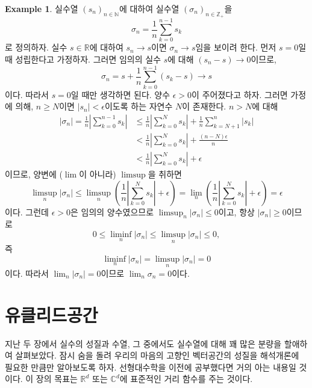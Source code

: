\documentclass[11pt]{book}
\numberwithin{equation}{chapter}
\def\NN{\mathbb{N}}
\def\ZZ{\mathbb{Z}}
\def\RR{\mathbb{R}}
\def\CC{\mathbb{C}}
\def\eps{\epsilon}
\newcommand{\abs}[1]{\left\vert#1\right\vert}
\newcommand{\paren}[1]{\left(#1\right)}
\theoremstyle{definition}
\newtheorem*{ex}{Example}
\begin{document}
    \begin{ex}
        실수열 \((s_n)_{n \in \NN}\)에 대하여 실수열 \((\sigma_n)_{n \in \ZZ_+}\)을
        \[
        \sigma_n = \frac{1}{n} \sum_{k=0}^{n-1} s_k    
        \]
        로 정의하자. 실수 \(s \in \RR\)에 대하여 \(s_n \to s\)이면 \(\sigma_n \to s\)임을 보이려 한다. 먼저 \(s = 0\)일 때 성립한다고 가정하자. 그러면 임의의 실수 \(s\)에 대해 \((s_n - s) \to 0\)이므로,
        \[
        \sigma_n = s + \frac{1}{n} \sum_{k=0}^{n-1} (s_k - s) \to s
        \]
        이다. 따라서 \(s = 0\)일 때만 생각하면 된다. 양수 \(\eps > 0\)이 주어졌다고 하자. 그러면 가정에 의해, \(n \ge N\)이면 \(\abs{s_n} < \eps\)이도록 하는 자연수 \(N\)이 존재한다. \(n > N\)에 대해
        \begin{align*}
			\abs{\sigma_n} = \frac{1}{n}\abs{\sum_{k=0}^{n-1}s_k} &\le \frac{1}{n}\abs{\sum_{k=0}^{N}s_k} + \frac{1}{n}\sum_{k=N+1}^{n}\abs{s_k}\\
			&< \frac{1}{n}\abs{\sum_{k=0}^{N}s_k} + \frac{(n-N)\eps}{n}\\
			&<  \frac{1}{n}\abs{\sum_{k=0}^{N}s_k} + \eps
		\end{align*}
        이므로, 양변에 (\(\lim\)이 아니라) \(\limsup\)을 취하면
        \[
        \limsup_n \abs{\sigma_n} \le \limsup_n \paren{\frac{1}{n}\abs{\sum_{k=0}^{N}s_k} + \eps} = \lim_n \paren{\frac{1}{n}\abs{\sum_{k=0}^{N}s_k} + \eps} = \eps
        \]
        이다. 그런데 \(\eps > 0\)은 임의의 양수였으므로 \(\limsup_n \abs{\sigma_n} \le 0\)이고, 항상 \(\abs{\sigma_n} \ge 0\)이므로 
        \[
        0 \le \liminf_n \abs{\sigma_n} \le \limsup_n \abs{\sigma_n} \le 0,
        \]
        즉
        \[
            \liminf_n \abs{\sigma_n} = \limsup_n \abs{\sigma_n} = 0
        \]
        이다. 따라서 \(\lim_n \abs{\sigma_n} = 0\)이므로 \(\lim_n {\sigma_n} = 0\)이다.
    \end{ex}



\chapter{유클리드공간} \label{sec 3}
지난 두 장에서 실수의 성질과 수열, 그 중에서도 실수열에 대해 꽤 많은 분량을 할애하여 살펴보았다. 잠시 숨을 돌려 우리의 마음의 고향인 벡터공간의 성질을 해석개론에 필요한 만큼만 알아보도록 하자. 선형대수학을 이전에 공부했다면 거의 아는 내용일 것이다. 이 장의 목표는 \(\RR^d\) 또는 \(\CC^d\)에 표준적인 거리 함수를 주는 것이다.
\end{document}
